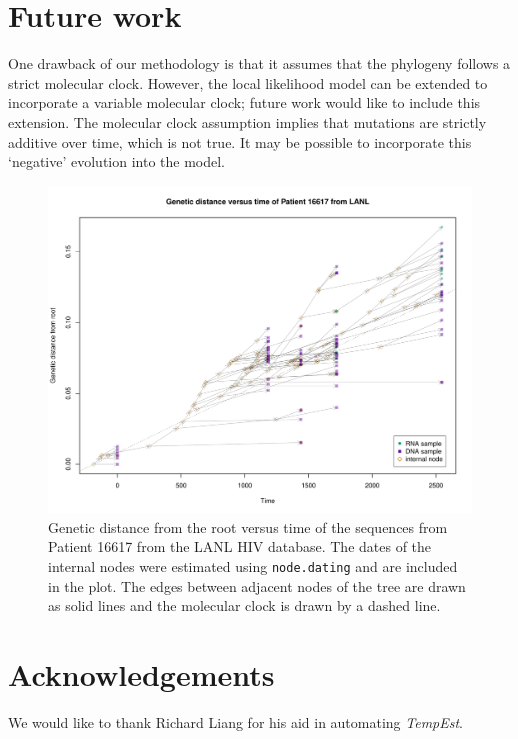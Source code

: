 \documentclass{bioinfo}
\newcommand{\code}[1]{{\tt #1}}
\begin{document}
\section{Future work} \label{sec:discuss}
One drawback of our methodology is that it assumes that the phylogeny follows a strict molecular clock.
However, the local likelihood model can be extended to incorporate a variable molecular clock; future work would like to include this extension.
The molecular clock assumption implies that mutations are strictly additive over time, which is not true.
It may be possible to incorporate this `negative' evolution into the model.

\begin{figure}[b]
	\centering
	\includegraphics[width=\columnwidth]{patient_16617}
	\caption[Genetic distance versus time plot]{Genetic distance from the root versus time of the sequences from Patient 16617 from the LANL HIV database. The dates of the internal nodes were estimated using \code{node.dating} and are included in the plot. The edges between adjacent nodes of the tree are drawn as solid lines and the molecular clock is drawn by a dashed line.}
	\label{fig:pat16617}
\end{figure}

\vspace*{-15pt}

\section*{Acknowledgements} \label{sec:ackn}
We would like to thank Richard Liang for his aid in automating \emph{TempEst}.
\end{document}
